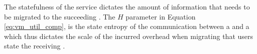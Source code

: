 


The statefulness of the service dictates the amount of information that needs to be migrated to the succeeding \dc{}.
The $H$ parameter in Equation \ref{eq:vm_util_comp}, is the state entropy of the communication between a \ue{} and a \dc{} which thus dictates the scale of the incurred overhead when migrating that users state the receiving \dc{}.